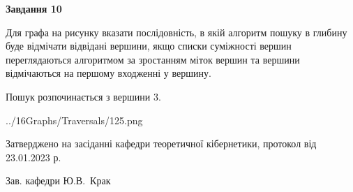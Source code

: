 \documentclass[12pt, ukrainian]{article}
\begin{document}
{\begin {large}
{\begin {center}\textbf{Завдання 10}\end {center}}\par
Для графа на рисунку вказати послідовність, в якій алгоритм пошуку в глибину буде відмічати відвідані вершини, якщо списки суміжності вершин переглядаються алгоритмом за зростанням міток вершин та вершини відмічаються на першому вход\-женні у вершину.\par
Пошук розпочинається з вершини 3.\par

\begin{center}
	{../16Graphs/Traversals/125.png}
\end{center}\par
\newpage


\end {large}
}
{\smallskip \begin {small} Затверджено на засіданні кафедри теоретичної кібернетики, протокол  від   23.01.2023 р.\par\smallskip\smallskip
{\parbox {6.5 cm}{Зав. кафедри \dotfill Ю.В.~Крак}} \end{small}}
\end{document}
